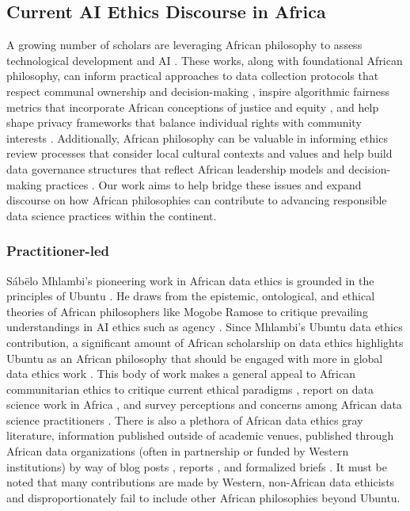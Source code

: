 \subsection{Current AI Ethics Discourse in Africa}
A growing number of scholars are leveraging African philosophy to assess technological development and AI \cite{ewuoso2021african, capurro2008information, ruttkampbloem2023epistemic, gwagwa2022role, attoe2023conversations}. 
These works, along with foundational African philosophy, can inform practical approaches to data collection protocols that respect communal ownership and decision-making \cite{buhler2023unlocking}, inspire algorithmic fairness metrics that incorporate African conceptions of justice and equity \cite{asiedu2024case}, and help shape privacy frameworks that balance individual rights with community interests \cite{jimoh2023quest}. Additionally, African philosophy can be valuable in informing ethics review processes that consider local cultural contexts and values and help build data governance structures that reflect African leadership models and decision-making practices \cite{chinweuba2019philosophy}. Our work aims to help bridge these issues and expand discourse on how African philosophies can contribute to advancing responsible data science practices within the continent.


\subsubsection{Practitioner-led}
Sábëlo Mhlambi's pioneering work in African data ethics is grounded in the principles of Ubuntu \cite{mhlambi2020from}. He draws from the epistemic, ontological, and ethical theories of African philosophers like Mogobe Ramose \cite{ramose2004ethicsofubuntu} to critique prevailing understandings in AI ethics such as agency \cite{mhlambi2023decolonizing}. Since Mhlambi's Ubuntu data ethics contribution, a significant amount of African scholarship on data ethics highlights Ubuntu as an African philosophy that should be engaged with more in global data ethics work \cite{gwagwa2022role, segun2021critically, langat2020how, kiemde2022towards, goffi2023teaching}.  
This body of work makes a general appeal to African communitarian ethics to critique current ethical paradigms \cite{metz2021african}, report on data science work in Africa \cite{day2023data}, and survey perceptions and concerns among African data science practitioners \cite{eke2022forgotten}. There is also a plethora of African data ethics gray literature, information published outside of academic venues, published through African data organizations (often in partnership or funded by Western institutions) by way of blog posts \cite{shilongo2023creativity}, reports \cite{sinha2023principlesafrofeminist}, and formalized briefs \cite{gwagwa2019recommendations}. 
It must be noted that many contributions are made by Western, non-African data ethicists and disproportionately fail to include other African philosophies beyond Ubuntu. 

